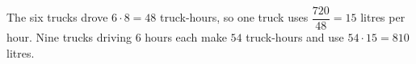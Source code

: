 The six trucks drove $6\cdot8=48$ truck-hours, so one truck uses $\dfrac{720}{48}=15$ litres per hour. Nine trucks driving $6$ hours each make $54$ truck-hours and use $54\cdot15=\boxed{810}$ litres.
